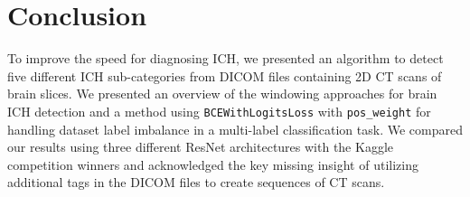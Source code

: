 \documentclass[runningheads]{llncs}
\begin{document}
\section{Conclusion}
To improve the speed for diagnosing ICH, we presented an algorithm to detect five different ICH sub-categories from DICOM files containing 2D CT scans of brain slices.
We presented an overview of the windowing approaches for brain ICH detection and a method using \texttt{BCEWithLogitsLoss} with \texttt{pos\_weight} for handling dataset label imbalance in a multi-label classification task.
We compared our results using three different ResNet architectures with the Kaggle competition winners and acknowledged the key missing insight of utilizing additional tags in the DICOM files to create sequences of CT scans.




\end{document}
